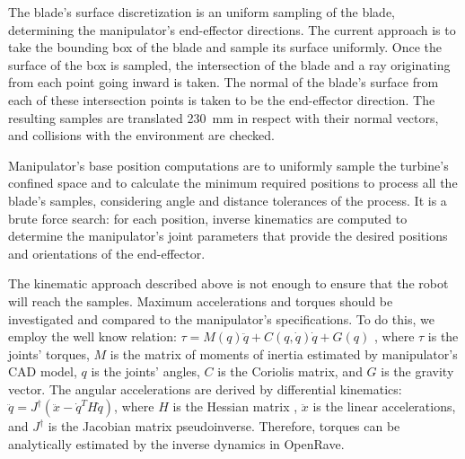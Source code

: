 The blade's surface discretization is an uniform sampling of the blade,
determining the manipulator's end-effector directions. The current approach
is to take the bounding box of the blade and sample its surface uniformly. Once the
surface of the box is sampled, the intersection of the blade and a ray
originating from each point going inward is taken. The normal of the blade's
surface from each of these intersection points is taken to be the end-effector
direction. %
The
resulting samples are translated 230~mm in respect with their normal vectors,
and collisions with the environment are checked.

Manipulator's base position computations are to uniformly sample the turbine's
confined space and to calculate the minimum required positions to process all
the blade's samples, considering angle and distance tolerances of the process.
It is a brute force search: for each position, inverse kinematics are computed
to determine the manipulator's joint parameters that provide the desired
positions and orientations of the end-effector.

The kinematic approach described above is not enough to ensure that the robot
will reach the samples. Maximum accelerations and torques should be investigated
and compared to the manipulator's specifications. To do this, we employ the
well know relation:
$\tau = M(q)\ddot{q} + C(q,\dot{q})\dot{q} + G(q)$
\cite{sciavicco2000differential}, where $\tau$ is the joints' torques, $M$ is
the matrix of moments of inertia estimated by manipulator's
CAD model, $q$ is the joints' angles, $C$ is the Coriolis matrix, and $G$ is the
gravity vector. The angular accelerations are derived by differential kinematics:
$\ddot{q}=J^\dagger(\ddot{x}-\dot{q}^TH\dot{q})$, where $H$ is the Hessian
matrix \cite{hourtash2005kinematic}, $\ddot{x}$ is the linear accelerations, and
$J^\dagger$ is the Jacobian matrix pseudoinverse. Therefore, torques can be
analytically estimated by the inverse dynamics in OpenRave.


